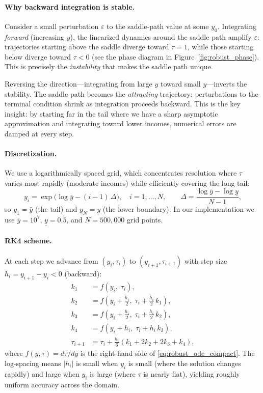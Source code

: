 \documentclass[12pt,a4paper]{article}
\theoremstyle{definition}
\theoremstyle{plain}
\theoremstyle{remark}
\begin{document}
\paragraph{Why backward integration is stable.}
Consider a small perturbation $\varepsilon$ to the saddle-path value at some $y_0$. Integrating \emph{forward} (increasing $y$), the linearized dynamics around the saddle path amplify $\varepsilon$: trajectories starting above the saddle diverge toward $\tau = 1$, while those starting below diverge toward $\tau < 0$ (see the phase diagram in Figure~\ref{fig:robust_phase}). This is precisely the \emph{instability} that makes the saddle path unique.

Reversing the direction---integrating from large $y$ toward small $y$---inverts the stability. The saddle path becomes the \emph{attracting} trajectory: perturbations to the terminal condition shrink as integration proceeds backward. This is the key insight: by starting far in the tail where we have a sharp asymptotic approximation and integrating toward lower incomes, numerical errors are damped at every step.

\paragraph{Discretization.}
We use a logarithmically spaced grid, which concentrates resolution where $\tau$ varies most rapidly (moderate incomes) while efficiently covering the long tail:
\[
  y_i = \exp\!\Big(\log\bar{y} - (i-1)\,\Delta\Big), \quad i = 1,\ldots,N, \qquad \Delta = \frac{\log\bar{y} - \log\underline{y}}{N-1},
\]
so $y_1 = \bar{y}$ (the tail) and $y_N = \underline{y}$ (the lower boundary). In our implementation we use $\bar{y} = 10^7$, $\underline{y} = 0.5$, and $N = 500{,}000$ grid points.

\paragraph{RK4 scheme.}
At each step we advance from $(y_i, \tau_i)$ to $(y_{i+1}, \tau_{i+1})$ with step size $h_i = y_{i+1} - y_i < 0$ (backward):
\begin{align*}
  k_1 &= f(y_i,\;\tau_i), \\
  k_2 &= f\!\left(y_i + \tfrac{h_i}{2},\;\tau_i + \tfrac{h_i}{2}\,k_1\right), \\
  k_3 &= f\!\left(y_i + \tfrac{h_i}{2},\;\tau_i + \tfrac{h_i}{2}\,k_2\right), \\
  k_4 &= f(y_i + h_i,\;\tau_i + h_i\,k_3), \\[4pt]
  \tau_{i+1} &= \tau_i + \frac{h_i}{6}\left(k_1 + 2k_2 + 2k_3 + k_4\right),
\end{align*}
where $f(y,\tau) = d\tau/dy$ is the right-hand side of \eqref{eq:robust_ode_compact}. The log-spacing means $|h_i|$ is small when $y_i$ is small (where the solution changes rapidly) and large when $y_i$ is large (where $\tau$ is nearly flat), yielding roughly uniform accuracy across the domain.
\end{document}
